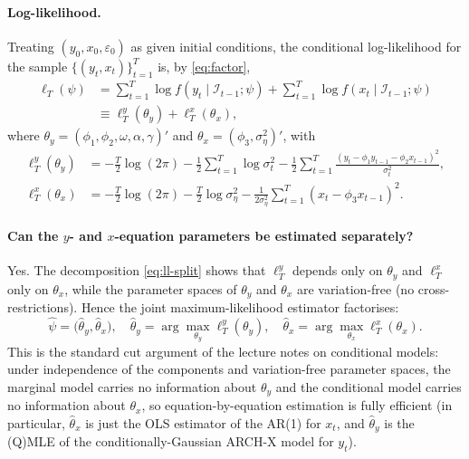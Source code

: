 \documentclass[12pt]{article}
\newcommand{\Info}{\mathcal{I}}
\begin{document}
\paragraph{Log-likelihood.} Treating $(y_0,x_0,\varepsilon_0)$ as given initial conditions, the conditional log-likelihood for the sample $\{(y_t,x_t)\}_{t=1}^{T}$ is, by \eqref{eq:factor},
\begin{align}
\ell_T(\psi)
&= \sum_{t=1}^{T}\log f(y_t\mid\Info_{t-1};\psi) + \sum_{t=1}^{T}\log f(x_t\mid\Info_{t-1};\psi)\nonumber\\
&\equiv \ell_T^{y}(\theta_y) + \ell_T^{x}(\theta_x),\label{eq:ll-split}
\end{align}
where $\theta_y=(\phi_1,\phi_2,\omega,\alpha,\gamma)'$ and $\theta_x=(\phi_3,\sigma_\eta^2)'$, with
\begin{align}
\ell_T^{y}(\theta_y) &= -\frac{T}{2}\log(2\pi) - \frac{1}{2}\sum_{t=1}^{T}\log\sigma_t^2 - \frac{1}{2}\sum_{t=1}^{T}\frac{(y_t-\phi_1 y_{t-1}-\phi_2 x_{t-1})^2}{\sigma_t^2},\label{eq:lly}\\
\ell_T^{x}(\theta_x) &= -\frac{T}{2}\log(2\pi) - \frac{T}{2}\log\sigma_\eta^2 - \frac{1}{2\sigma_\eta^2}\sum_{t=1}^{T}(x_t-\phi_3 x_{t-1})^2.\label{eq:llx}
\end{align}

\paragraph{Can the $y$- and $x$-equation parameters be estimated separately?} Yes. The decomposition \eqref{eq:ll-split} shows that $\ell_T^{y}$ depends only on $\theta_y$ and $\ell_T^{x}$ only on $\theta_x$, while the parameter spaces of $\theta_y$ and $\theta_x$ are variation-free (no cross-restrictions). Hence the joint maximum-likelihood estimator factorises:
\begin{equation*}
\widehat{\psi} = \big(\widehat{\theta}_y,\widehat{\theta}_x\big),\quad
\widehat{\theta}_y=\arg\max_{\theta_y}\ell_T^{y}(\theta_y),\quad
\widehat{\theta}_x=\arg\max_{\theta_x}\ell_T^{x}(\theta_x).
\end{equation*}
This is the standard cut argument of the lecture notes on conditional models: under independence of the components and variation-free parameter spaces, the marginal model carries no information about $\theta_y$ and the conditional model carries no information about $\theta_x$, so equation-by-equation estimation is fully efficient (in particular, $\widehat{\theta}_x$ is just the OLS estimator of the AR(1) for $x_t$, and $\widehat{\theta}_y$ is the (Q)MLE of the conditionally-Gaussian ARCH-X model for $y_t$).
\end{document}
